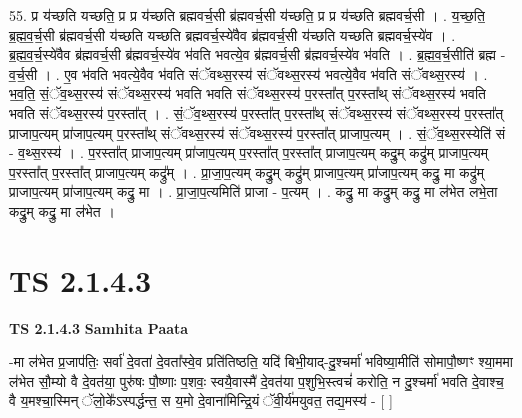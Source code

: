 \documentclass[17pt]{extarticle}
\begin{document}
55. प्र य॑च्छति यच्छति॒ प्र प्र य॑च्छति ब्रह्मवर्च॒सी ब्र॑ह्मवर्च॒सी य॑च्छति॒ प्र प्र य॑च्छति ब्रह्मवर्च॒सी । . य॒च्छ॒ति॒ ब्र॒ह्म॒व॒र्च॒सी ब्र॑ह्मवर्च॒सी य॑च्छति यच्छति ब्रह्मवर्च॒स्ये॑वैव ब्र॑ह्मवर्च॒सी य॑च्छति यच्छति ब्रह्मवर्च॒स्ये॑व । . ब्र॒ह्म॒व॒र्च॒स्ये॑वैव ब्र॑ह्मवर्च॒सी ब्र॑ह्मवर्च॒स्ये॑व भ॑वति भवत्ये॒व ब्र॑ह्मवर्च॒सी ब्र॑ह्मवर्च॒स्ये॑व भ॑वति । . ब्र॒ह्म॒व॒र्च॒सीति॑ ब्रह्म - व॒र्च॒सी । . ए॒व भ॑वति भवत्ये॒वैव भ॑वति संॅवथ्स॒रस्य॑ संॅवथ्स॒रस्य॑ भवत्ये॒वैव भ॑वति संॅवथ्स॒रस्य॑ । . भ॒व॒ति॒ सं॒ॅव॒थ्स॒रस्य॑ संॅवथ्स॒रस्य॑ भवति भवति संॅवथ्स॒रस्य॑ प॒रस्ता᳚त् प॒रस्ता᳚थ् संॅवथ्स॒रस्य॑ भवति भवति संॅवथ्स॒रस्य॑ प॒रस्ता᳚त् । . सं॒ॅव॒थ्स॒रस्य॑ प॒रस्ता᳚त् प॒रस्ता᳚थ् संॅवथ्स॒रस्य॑ संॅवथ्स॒रस्य॑ प॒रस्ता᳚त् प्राजाप॒त्यम् प्रा॑जाप॒त्यम् प॒रस्ता᳚थ् संॅवथ्स॒रस्य॑ संॅवथ्स॒रस्य॑ प॒रस्ता᳚त् प्राजाप॒त्यम् । . सं॒ॅव॒थ्स॒रस्येति॑ सं - व॒थ्स॒रस्य॑ । . प॒रस्ता᳚त् प्राजाप॒त्यम् प्रा॑जाप॒त्यम् प॒रस्ता᳚त् प॒रस्ता᳚त् प्राजाप॒त्यम् कद्रु॒म् कद्रु॑म् प्राजाप॒त्यम् प॒रस्ता᳚त् प॒रस्ता᳚त् प्राजाप॒त्यम् कद्रु᳚म् । . प्रा॒जा॒प॒त्यम् कद्रु॒म् कद्रु॑म् प्राजाप॒त्यम् प्रा॑जाप॒त्यम् कद्रु॒ मा कद्रु॑म् प्राजाप॒त्यम् प्रा॑जाप॒त्यम् कद्रु॒ मा । . प्रा॒जा॒प॒त्यमिति॑ प्राजा - प॒त्यम् । . कद्रु॒ मा कद्रु॒म् कद्रु॒ मा ल॑भेत लभे॒ता कद्रु॒म् कद्रु॒ मा ल॑भेत । \newline
\pagebreak
{}
\section*{ TS 2.1.4.3 }

\textbf{TS 2.1.4.3 } \newline
\textbf{Samhita Paata} \newline

-मा ल॑भेत प्र॒जाप॑तिः॒ सर्वा॑ दे॒वता॑ दे॒वता᳚स्वे॒व प्रति॑तिष्ठति॒ यदि॑ बिभी॒याद्-दु॒श्चर्मा॑ भविष्या॒मीति॑ सोमापौ॒ष्णꣳ श्या॒ममा ल॑भेत सौ॒म्यो वै दे॒वत॑या॒ पुरु॑षः पौ॒ष्णाः प॒शवः॒ स्वयै॒वास्मै॑ दे॒वत॑या प॒शुभि॒स्त्वचं॑ करोति॒ न दु॒श्चर्मा॑ भवति दे॒वाश्च॒ वै य॒मश्चा॒स्मिन् ॅलो॒के᳚ऽस्पर्द्धन्त॒ स य॒मो दे॒वाना॑मिन्द्रि॒यं ॅवी॒र्य॑मयुवत॒ तद्य॒मस्य॑ - [  ] \newline
\end{document}
